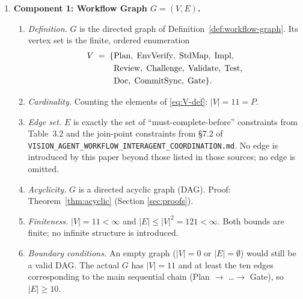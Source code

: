 \documentclass[12pt]{article}
\theoremstyle{definition}
\newcommand{\code}[1]{\texttt{#1}}
\newcommand{\VisionFlow}{\code{VISION\_AGENT\_\allowbreak WORKFLOW\_\allowbreak INTERAGENT\_\allowbreak COORDINATION.md}}
\begin{document}
\begin{enumerate}
  \item \textbf{Component 1: Workflow Graph $G = (V,E)$.}
  \begin{enumerate}
    \item[1.1] \emph{Definition.}
               $G$ is the directed graph of
               Definition~\ref{def:workflow-graph}.  Its vertex set
               is the finite, ordered enumeration
               \begin{align}
                 V \;=\;
                 \{&\mathrm{Plan},\;
                   \mathrm{EnvVerify},\;
                   \mathrm{StdMap},\;
                   \mathrm{Impl},\notag\\
                 &\mathrm{Review},\;
                   \mathrm{Challenge},\;
                   \mathrm{Validate},\;
                   \mathrm{Test},\notag\\
                 &\mathrm{Doc},\;
                   \mathrm{CommitSync},\;
                   \mathrm{Gate}\}. \label{eq:V-def}
               \end{align}
    \item[1.2] \emph{Cardinality.}
               Counting the elements of \eqref{eq:V-def}:
               $|V| = 11 = P$.
    \item[1.3] \emph{Edge set.}
               $E$ is exactly the set of ``must-complete-before''
               constraints from Table~3.2 and the join-point
               constraints from \S7.2 of \VisionFlow{}.
               No edge is introduced by this paper beyond those listed
               in those sources; no edge is omitted.
    \item[1.4] \emph{Acyclicity.}
               $G$ is a directed acyclic graph (DAG).
               Proof: Theorem~\ref{thm:acyclic} (Section
               \ref{sec:proofs}).
    \item[1.5] \emph{Finiteness.}
               $|V| = 11 < \infty$ and
               $|E| \leq |V|^2 = 121 < \infty$.
               Both bounds are finite; no infinite structure is
               introduced.
    \item[1.6] \emph{Boundary conditions.}
               An empty graph ($|V|=0$ or $|E|=\emptyset$) would
               still be a valid DAG.  The actual $G$ has $|V|=11$
               and at least the ten edges corresponding to the main
               sequential chain
               (Plan $\to$ \ldots $\to$ Gate), so $|E| \geq 10$.
  \end{enumerate}


\end{enumerate}
\end{document}
